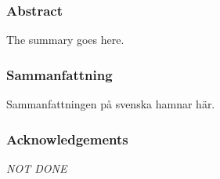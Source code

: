 \clearpage{\thispagestyle{empty}}
\begin{center}
	\subsubsection*{Abstract}
\end{center}
	
	The summary goes here. %
	
\begin{center}
	\item\subsubsection*{Sammanfattning}
\end{center}
	
	Sammanfattningen på svenska hamnar här. %

\begin{center}
	\item\subsubsection*{Acknowledgements}
\end{center}
	
	\textit{NOT DONE}
	
	


